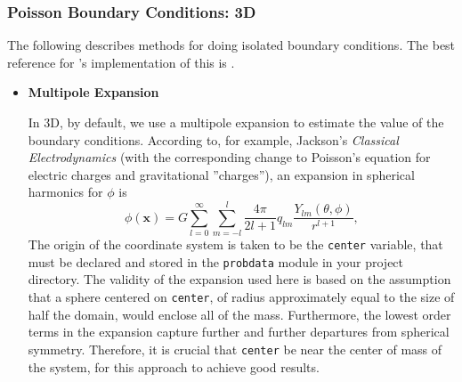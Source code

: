 \subsubsection{Poisson Boundary Conditions: 3D}\label{sec-poisson-3d-bcs}

The following describes methods for doing isolated boundary
conditions.  The best reference for \castro's implementation of this
is \cite{katz:2016}.

\begin{itemize}
\item \textbf{Multipole Expansion}

In 3D, by default, we use a multipole expansion to estimate the value
of the boundary conditions. According to, for example, Jackson's
\textit{Classical Electrodynamics} (with the corresponding change to
Poisson's equation for electric charges and gravitational
''charges''), an expansion in spherical harmonics for $\phi$ is
\begin{equation}
  \phi(\mathbf{x}) = G\sum_{l=0}^{\infty}\sum_{m=-l}^{l} \frac{4\pi}{2l + 1} q_{lm} \frac{Y_{lm}(\theta,\phi)}{r^{l+1}}, \label{spherical_harmonic_expansion}
\end{equation}
The origin of the coordinate system is taken to be the \texttt{center}
variable, that must be declared and stored in the \texttt{probdata}
module in your project directory. The validity of the expansion used
here is based on the assumption that a sphere centered on
\texttt{center}, of radius approximately equal to the size of half the
domain, would enclose all of the mass. Furthermore, the lowest order
terms in the expansion capture further and further departures from
spherical symmetry. Therefore, it is crucial that \texttt{center} be
near the center of mass of the system, for this approach to achieve
good results.


\end{itemize}
